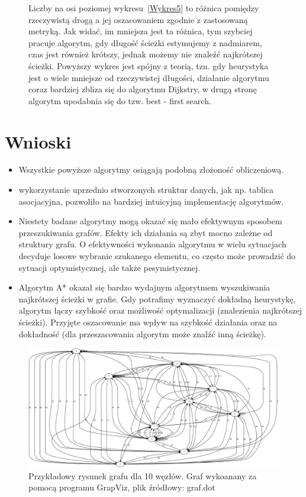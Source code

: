 \documentclass[a4paper,11pt]{article}
\begin{document}
\begin{enumerate}
\begin{figure}[th]
Liczby na osi poziomej wykresu~\ref{Wykres5} to różnica pomiędzy rzeczywistą drogą a jej oszacowaniem zgodnie z zastosowaną metryką. Jak widać, im mniejsza jest ta różnica,
tym szybciej pracuje algorytm, gdy długość ścieżki estymujemy z nadmiarem, czas jest również krótszy, jednak możemy nie znaleźć najkrótszej ścieżki.
Powyższy wykres jest spójny z teorią, tzn. gdy heurystyka jest o wiele mniejsze od rzeczywistej długości, działanie algorytmu coraz bardziej zbliza się do algorytmu Dijkstry, w 
drugą stronę algorytm upodabnia się do tzw. best - first search.

\end{figure} 

\end{enumerate}

\section{Wnioski}

\begin{itemize}
\item Wszystkie powyższe algorytmy osiągają podobną złożoność obliczeniową.

\item wykorzystanie uprzednio stworzonych struktur danych, jak np. tablica asocjacyjna, pozwoliło na bardziej intuicyjną implementację algorytmów.

\item Niestety badane algorytmy mogą okazać się mało efektywnym sposobem przeszukiwania grafów. Efekty ich działania są zbyt mocno zależne od struktury grafu. O efektywności 
wykonania algorytmu w wielu sytuacjach decyduje losowe wybranie szukanego elementu, co często może prowadzić do sytuacji optymistycznej, ale także pesymistycznej.
\item Algorytm A* okazał się bardzo wydajnym algorytmem wyszukiwania najkrótszej ścieżki w grafie. Gdy potrafimy wyznaczyć dokładną heurystykę, algorytm łączy szybkość oraz 
możliwość optymalizacji (znalezienia najkrótszej ścieżki). Przyjęte oszacowanie ma wpływ na szybkość działania oraz na dokładność (dla przeszacowania algorytm może znalźć inną ścieżkę).

\end{itemize}

\begin{figure}[th]
\centering
\includegraphics[width = 1\textwidth]{../prj/graf.dot.eps}
\caption{Przykładowy rysunek grafu dla 10 węzłów. Graf wykoanany za pomocą programu GrapViz, plik źródłowy: graf.dot}
\label{graf}
\end{figure} 
\end{document}
